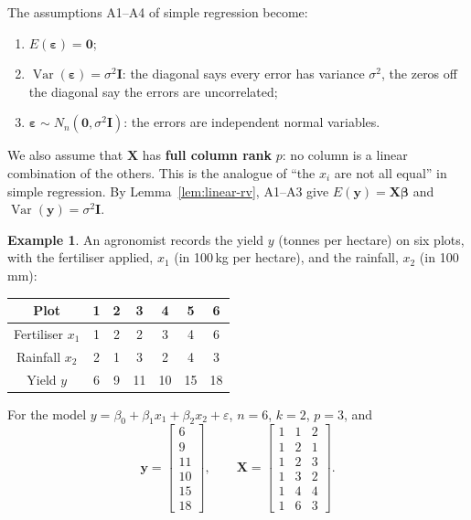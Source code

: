 \documentclass[11pt,a4paper]{article}
\numberwithin{equation}{section}
\theoremstyle{definition}
\newtheorem{exa}[thm]{Example}
\begin{document}
The assumptions A1--A4 of simple regression become:
\begin{enumerate}[label=\textbf{A\arabic*.}]
\item $E(\boldsymbol\varepsilon) = \mathbf{0}$;
\item[\textbf{A2--3.}] $\operatorname{Var}(\boldsymbol\varepsilon) = \sigma^2 \mathbf{I}$: the
diagonal says every error has variance $\sigma^2$, the zeros off the diagonal say the errors
are uncorrelated;
\setcounter{enumi}{3}
\item $\boldsymbol\varepsilon \sim N_n(\mathbf{0}, \sigma^2\mathbf{I})$: the errors are
independent normal variables.
\end{enumerate}
We also assume that $\mathbf{X}$ has \textbf{full column rank} $p$: no column is a linear
combination of the others. This is the analogue of ``the $x_i$ are not all equal'' in simple
regression. By Lemma~\ref{lem:linear-rv}, A1--A3 give
$E(\mathbf{y}) = \mathbf{X}\boldsymbol\beta$ and $\operatorname{Var}(\mathbf{y}) = \sigma^2\mathbf{I}$.

\begin{exa}\label{exa:crop}
An agronomist records the yield $y$ (tonnes per hectare) on six plots, with the fertiliser
applied, $x_1$ (in 100\,kg per hectare), and the rainfall, $x_2$ (in 100\,mm):
\begin{center}
\begin{tabular}{c|cccccc}
Plot & 1 & 2 & 3 & 4 & 5 & 6 \\
\hline
Fertiliser $x_1$ & 1 & 2 & 2 & 3 & 4 & 6 \\
Rainfall $x_2$ & 2 & 1 & 3 & 2 & 4 & 3 \\
Yield $y$ & 6 & 9 & 11 & 10 & 15 & 18 \\
\end{tabular}
\end{center}
For the model $y = \beta_0 + \beta_1 x_1 + \beta_2 x_2 + \varepsilon$, $n = 6$, $k = 2$,
$p = 3$, and
\[
\mathbf{y} = \begin{bmatrix} 6 \\ 9 \\ 11 \\ 10 \\ 15 \\ 18 \end{bmatrix}, \qquad
\mathbf{X} = \begin{bmatrix}
1 & 1 & 2 \\ 1 & 2 & 1 \\ 1 & 2 & 3 \\ 1 & 3 & 2 \\ 1 & 4 & 4 \\ 1 & 6 & 3
\end{bmatrix} .
\]
\end{exa}
\end{document}
